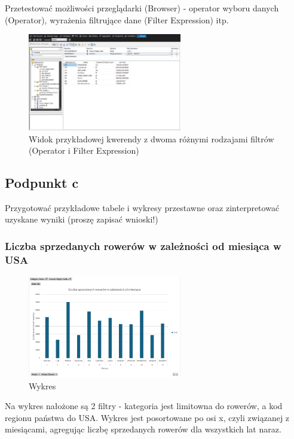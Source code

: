 \documentclass[a4paper,12pt]{article}
\begin{document}
Przetestować możliwości przeglądarki (Browser) - operator wyboru danych (Operator), wyrażenia filtrujące dane (Filter Expression) itp.

\begin{figure}[H]
  \includegraphics[width=0.6\textwidth]{images/2b.png}
  \caption{Widok przykładowej kwerendy z dwoma różnymi rodzajami filtrów (Operator i Filter Expression)}
\end{figure}

\subsection{Podpunkt c}

Przygotować przykładowe tabele i wykresy przestawne oraz zinterpretować uzyskane
wyniki (proszę zapisać wnioski!)

\subsubsection{Liczba sprzedanych rowerów w zależności od miesiąca w USA}

\begin{figure}[H]
  \includegraphics[width=0.6\textwidth]{images/bike_sales.png}
  \caption{Wykres}
\end{figure}

Na wykres nałożone są 2 filtry - kategoria jest limitowna do rowerów, a kod regionu państwa do USA. Wykres jest posortowane po osi x, czyli związanej z miesiącami, agregując liczbę sprzedanych rowerów dla wszystkich lat naraz.
\end{document}
